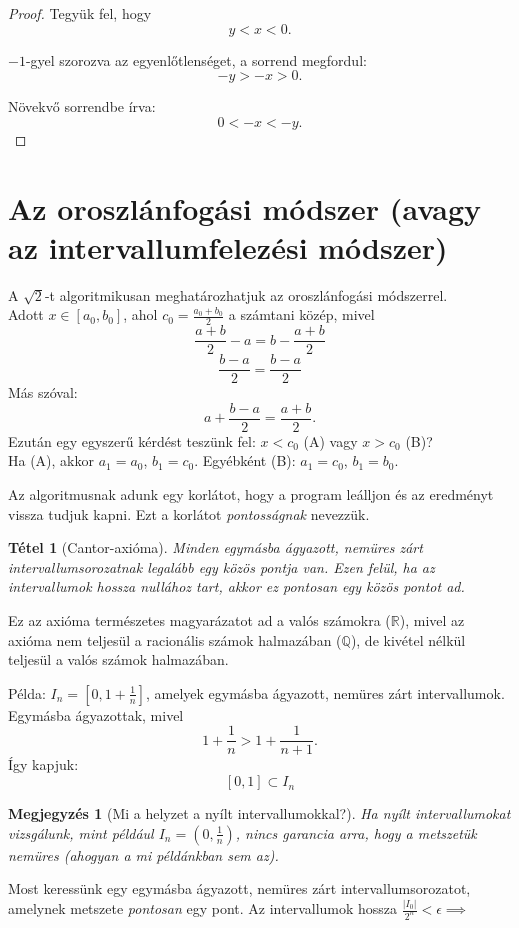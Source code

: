 \documentclass{article}
\newtheorem{theorem}{Tétel}
\newtheorem{remark}{Megjegyzés}
\begin{document}
\begin{proof}
Tegyük fel, hogy
\[
y < x < 0.
\]

$-1$-gyel szorozva az egyenlőtlenséget, a sorrend megfordul:
\[
-y > -x > 0.
\]

Növekvő sorrendbe írva:
\[
0 < -x < -y.
\]
\end{proof}

\section{Az oroszlánfogási módszer (avagy az intervallumfelezési módszer)}
A $\sqrt{2}$-t algoritmikusan meghatározhatjuk az oroszlánfogási módszerrel.\\
Adott $x \in [a_0, b_0]$, ahol $c_0 = \frac{a_0 + b_0}{2}$ a számtani közép, mivel
\[
    \frac{a + b}{2} - a = b - \frac{a+b}{2}
\]
\[
    \frac{b-a}{2} = \frac{b-a}{2}
\]
Más szóval:
\[
    a + \frac{b-a}{2} = \frac{a+b}{2}.
\]
Ezután egy egyszerű kérdést teszünk fel: $x < c_0$ (A) vagy $x > c_0$ (B)?\\
Ha (A), akkor $a_1 = a_0$, $b_1 = c_0$. Egyébként (B): $a_1 = c_0$, $b_1 = b_0$.

Az algoritmusnak adunk egy korlátot, hogy a program leálljon és az eredményt vissza tudjuk kapni. Ezt a korlátot \emph{pontosságnak} nevezzük.

\begin{theorem}[Cantor-axióma]
    Minden egymásba ágyazott, nemüres zárt intervallumsorozatnak legalább egy közös pontja van. Ezen felül, ha az intervallumok hossza nullához tart, akkor ez \emph{pontosan} egy közös pontot ad.
\end{theorem}
Ez az axióma természetes magyarázatot ad a valós számokra ($\mathbb{R}$), mivel az axióma nem teljesül a racionális számok halmazában ($\mathbb{Q}$), de kivétel nélkül teljesül a valós számok halmazában.

Példa: $I_n = [0, 1 + \frac{1}{n}]$, amelyek egymásba ágyazott, nemüres zárt intervallumok. Egymásba ágyazottak, mivel
\[
    1 + \frac{1}{n} > 1 + \frac{1}{n+1}.
\]
Így kapjuk:
\[
    [0, 1] \subset I_n
\]

\begin{remark}[Mi a helyzet a nyílt intervallumokkal?]
Ha nyílt intervallumokat vizsgálunk, mint például $I_n = (0, \frac{1}{n})$, nincs garancia arra, hogy a metszetük nemüres (ahogyan a mi példánkban sem az).
\end{remark}

Most keressünk egy egymásba ágyazott, nemüres zárt intervallumsorozatot, amelynek metszete \emph{pontosan} egy pont.
Az intervallumok hossza $\frac{|I_0|}{2^n} < \epsilon \implies$
\end{document}
